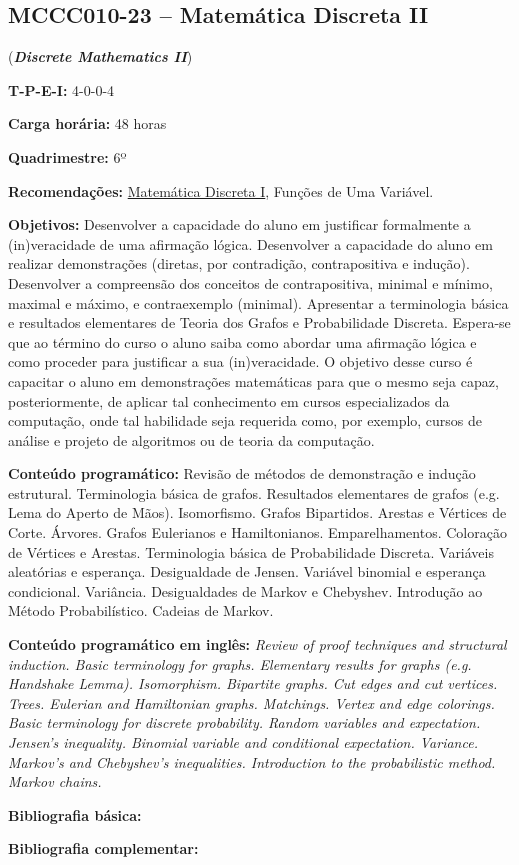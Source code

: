 \documentclass[class=article, crop=false]{standalone}
\begin{document}
\subsection*{MCCC010-23 -- Matemática Discreta II}
\label{disc:mdII}

(\textbf{\textit{Discrete Mathematics II}})

\begin{center}
	\begin{minipage}{0.85\textwidth}
		\textbf{T-P-E-I:} 4-0-0-4

		\textbf{Carga horária:} 48 horas

		\textbf{Quadrimestre:} 6º

		\textbf{Recomendações:} 
        \hyperref[disc:mdI]{Matemática Discreta I},
        Funções de Uma Variável.

	\end{minipage}
\end{center}

\textbf{Objetivos:}
Desenvolver a capacidade do aluno em justificar formalmente a (in)veracidade de
uma afirmação lógica.
Desenvolver a capacidade do aluno em realizar demonstrações (diretas, por
contradição, contrapositiva e indução).
Desenvolver a compreensão dos conceitos de contrapositiva, minimal e mínimo,
maximal e máximo, e contraexemplo (minimal).
Apresentar a terminologia básica e resultados elementares de Teoria dos Grafos
e Probabilidade Discreta.
Espera-se que ao término do curso o aluno saiba como abordar uma afirmação
lógica e como proceder para justificar a sua (in)veracidade.
O objetivo desse curso é capacitar o aluno em demonstrações matemáticas para
que o mesmo seja capaz, posteriormente, de aplicar tal conhecimento em cursos
especializados da computação, onde tal habilidade seja requerida como, por
exemplo, cursos de análise e projeto de algoritmos ou de teoria da computação.

\textbf{Conteúdo programático:}
Revisão de métodos de demonstração e indução estrutural.
Terminologia básica de grafos.
Resultados elementares de grafos (e.g. Lema do Aperto de Mãos).
Isomorfismo.
Grafos Bipartidos.
Arestas e Vértices de Corte.
Árvores.
Grafos Eulerianos e Hamiltonianos.
Emparelhamentos.
Coloração de Vértices e Arestas.
Terminologia básica de Probabilidade Discreta.
Variáveis aleatórias e esperança.
Desigualdade de Jensen.
Variável binomial e esperança condicional.
Variância.
Desigualdades de Markov e Chebyshev.
Introdução ao Método Probabilístico.
Cadeias de Markov.

\textbf{Conteúdo programático em inglês:}
\textit{Review of proof techniques and structural induction.
Basic terminology for graphs.
Elementary results for graphs (e.g. Handshake Lemma).
Isomorphism.
Bipartite graphs.
Cut edges and cut vertices.
Trees.
Eulerian and Hamiltonian graphs.
Matchings.
Vertex and edge colorings.
Basic terminology for discrete probability.
Random variables and expectation.
Jensen's inequality.
Binomial variable and conditional expectation.
Variance.
Markov's and Chebyshev's inequalities.
Introduction to the probabilistic method.
Markov chains.}

\newrefsection
\textbf{Bibliografia básica:}
\nocite{2008-bondy-murty,2012-rosen-etal,2017-mitzenmacher-upfal}
\printbibliography

\newrefsection
\textbf{Bibliografia complementar:}
\nocite{2018-diestel,1996-west,2008-ash,2010-ross}
\printbibliography
\end{document}
